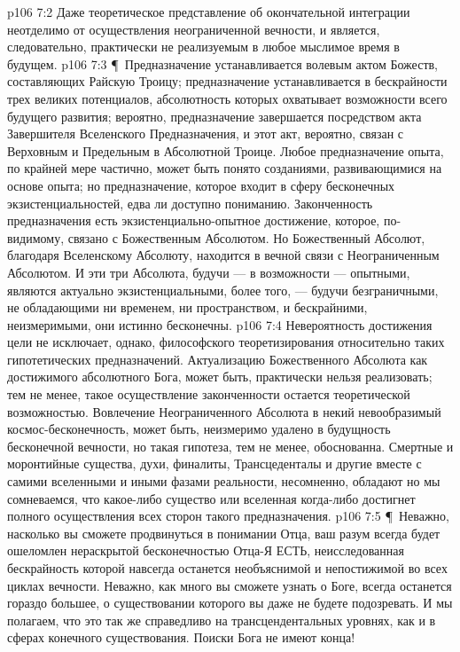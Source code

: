 \vs p106 7:2 Даже теоретическое представление об окончательной интеграции неотделимо от осуществления неограниченной вечности, и является, следовательно, практически не реализуемым в любое мыслимое время в будущем.
\vs p106 7:3 \P\ Предназначение устанавливается волевым актом Божеств, составляющих Райскую Троицу; предназначение устанавливается в бескрайности трех великих потенциалов, абсолютность которых охватывает возможности всего будущего развития; вероятно, предназначение завершается посредством акта Завершителя Вселенского Предназначения, и этот акт, вероятно, связан с Верховным и Предельным в Абсолютной Троице. Любое предназначение опыта, по крайней мере частично, может быть понято созданиями, развивающимися на основе опыта; но предназначение, которое входит в сферу бесконечных экзистенциальностей, едва ли доступно пониманию. Законченность предназначения есть экзистенциально\hyp{}опытное достижение, которое, по\hyp{}видимому, связано с Божественным Абсолютом. Но Божественный Абсолют, благодаря Вселенскому Абсолюту, находится в вечной связи с Неограниченным Абсолютом. И эти три Абсолюта, будучи --- в возможности --- опытными, являются актуально экзистенциальными, более того, --- будучи безграничными, не обладающими ни временем, ни пространством, и бескрайними, неизмеримыми, они истинно бесконечны.
\vs p106 7:4 Невероятность достижения цели не исключает, однако, философского теоретизирования относительно таких гипотетических предназначений. Актуализацию Божественного Абсолюта как достижимого абсолютного Бога, может быть, практически нельзя реализовать; тем не менее, такое осуществление законченности остается теоретической возможностью. Вовлечение Неограниченного Абсолюта в некий невообразимый космос\hyp{}бесконечность, может быть, неизмеримо удалено в будущность бесконечной вечности, но такая гипотеза, тем не менее, обоснованна. Смертные и моронтийные существа, духи, финалиты, Трансцеденталы и другие вместе с самими вселенными и иными фазами реальности, несомненно, обладают   но мы сомневаемся, что какое\hyp{}либо существо или вселенная когда\hyp{}либо достигнет полного осуществления всех сторон такого предназначения.
\vs p106 7:5 \P\ Неважно, насколько вы сможете продвинуться в понимании Отца, ваш разум всегда будет ошеломлен нераскрытой бесконечностью Отца\hyp{}Я ЕСТЬ, неисследованная бескрайность которой навсегда останется необъяснимой и непостижимой во всех циклах вечности. Неважно, как много вы сможете узнать о Боге, всегда останется гораздо большее, о существовании которого вы даже не будете подозревать. И мы полагаем, что это так же справедливо на трансцендентальных уровнях, как и в сферах конечного существования. Поиски Бога не имеют конца!
